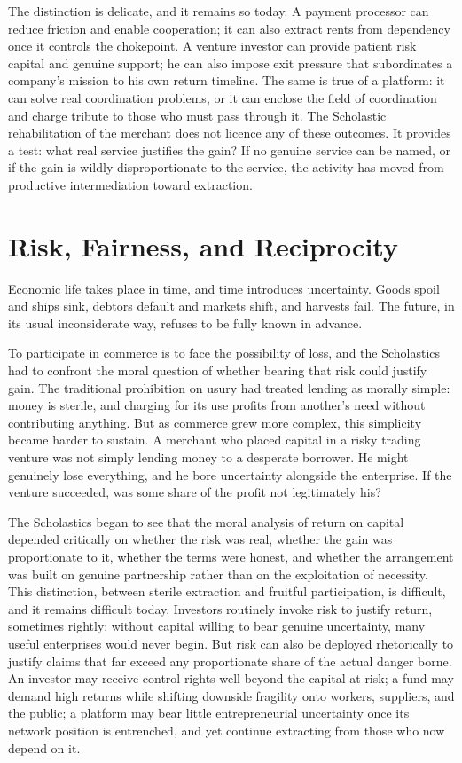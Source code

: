 \documentclass[11pt,a4paper,oneside]{book}
\begin{document}
The distinction is delicate, and it remains so today. A payment processor can reduce friction and enable cooperation; it can also extract rents from dependency once it controls the chokepoint. A venture investor can provide patient risk capital and genuine support; he can also impose exit pressure that subordinates a company's mission to his own return timeline. The same is true of a platform: it can solve real coordination problems, or it can enclose the field of coordination and charge tribute to those who must pass through it. The Scholastic rehabilitation of the merchant does not licence any of these outcomes. It provides a test: what real service justifies the gain? If no genuine service can be named, or if the gain is wildly disproportionate to the service, the activity has moved from productive intermediation toward extraction.

\section*{Risk, Fairness, and Reciprocity}

Economic life takes place in time, and time introduces uncertainty. Goods spoil and ships sink, debtors default and markets shift, and harvests fail. The future, in its usual inconsiderate way, refuses to be fully known in advance.

To participate in commerce is to face the possibility of loss, and the Scholastics had to confront the moral question of whether bearing that risk could justify gain. The traditional prohibition on usury had treated lending as morally simple: money is sterile, and charging for its use profits from another's need without contributing anything. But as commerce grew more complex, this simplicity became harder to sustain. A merchant who placed capital in a risky trading venture was not simply lending money to a desperate borrower. He might genuinely lose everything, and he bore uncertainty alongside the enterprise. If the venture succeeded, was some share of the profit not legitimately his?

The Scholastics began to see that the moral analysis of return on capital depended critically on whether the risk was real, whether the gain was proportionate to it, whether the terms were honest, and whether the arrangement was built on genuine partnership rather than on the exploitation of necessity. This distinction, between sterile extraction and fruitful participation, is difficult, and it remains difficult today. Investors routinely invoke risk to justify return, sometimes rightly: without capital willing to bear genuine uncertainty, many useful enterprises would never begin. But risk can also be deployed rhetorically to justify claims that far exceed any proportionate share of the actual danger borne. An investor may receive control rights well beyond the capital at risk; a fund may demand high returns while shifting downside fragility onto workers, suppliers, and the public; a platform may bear little entrepreneurial uncertainty once its network position is entrenched, and yet continue extracting from those who now depend on it.
\end{document}

